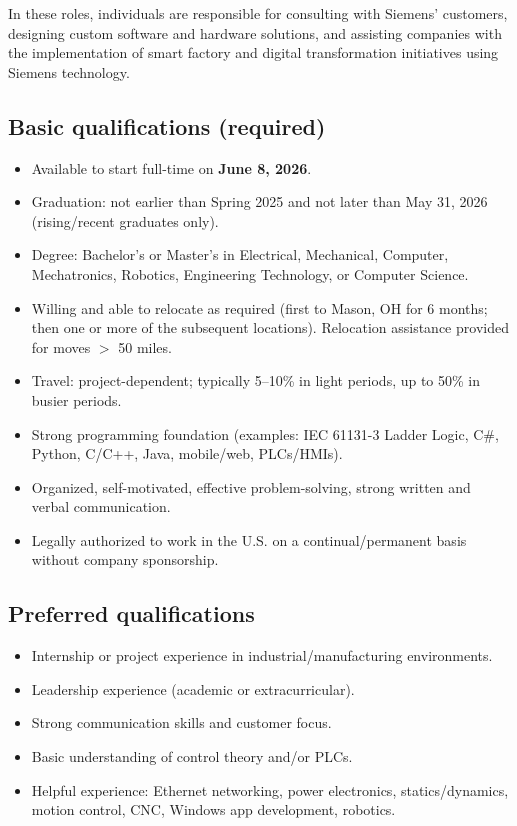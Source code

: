 \documentclass[11pt]{article}
\begin{document}
In these roles, individuals are responsible for consulting with Siemens' customers, designing custom software and hardware solutions, and assisting companies with the implementation of smart factory and digital transformation initiatives using Siemens technology.

\subsection*{Basic qualifications (required)}
\begin{itemize}
  \item Available to start full-time on \textbf{June 8, 2026}.
  \item Graduation: not earlier than Spring 2025 and not later than May 31, 2026 (rising/recent graduates only).
  \item Degree: Bachelor's or Master's in Electrical, Mechanical, Computer, Mechatronics, Robotics, Engineering Technology, or Computer Science.
  \item Willing and able to relocate as required (first to Mason, OH for 6 months; then one or more of the subsequent locations). Relocation assistance provided for moves $>$ 50 miles.
  \item Travel: project-dependent; typically 5--10\% in light periods, up to 50\% in busier periods.
  \item Strong programming foundation (examples: IEC 61131-3 Ladder Logic, C\#, Python, C/C++, Java, mobile/web, PLCs/HMIs).
  \item Organized, self-motivated, effective problem-solving, strong written and verbal communication.
  \item Legally authorized to work in the U.S. on a continual/permanent basis without company sponsorship.
\end{itemize}

\subsection*{Preferred qualifications}
\begin{itemize}
  \item Internship or project experience in industrial/manufacturing environments.
  \item Leadership experience (academic or extracurricular).
  \item Strong communication skills and customer focus.
  \item Basic understanding of control theory and/or PLCs.
  \item Helpful experience: Ethernet networking, power electronics, statics/dynamics, motion control, CNC, Windows app development, robotics.
\end{itemize}
\end{document}

